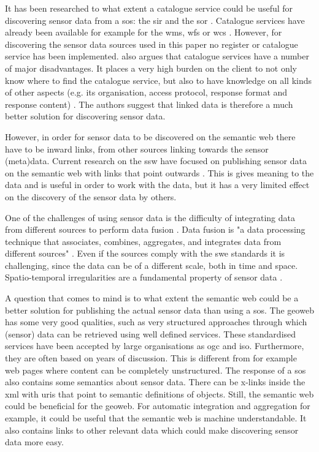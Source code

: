 It has been researched to what extent a catalogue service could be useful for discovering sensor data from a \ac{sos}: the \ac{sir} \citep{SW:OGC3} and the \ac{sor} \citep{SW:OGC4}. Catalogue services have already been available for example for the \ac{wms}, \ac{wfs} or \ac{wcs} \citep{SDI:OGC2}. However, for discovering the sensor data sources used in this paper no register or catalogue service has been implemented. \cite{SSW:Atkinson} also argues that catalogue services have a number of major disadvantages. It places a very high burden on the client to not only know where to find the catalogue service, but also to have knowledge on all kinds of other aspects (e.g. its organisation, access protocol, response format and response content) \cite[p.128]{SSW:Atkinson}. The authors suggest that linked data is therefore a much better solution for discovering sensor data. 

However, in order for sensor data to be discovered on the semantic web there have to be inward links, from other sources linking towards the sensor (meta)data. Current research on the \ac{ssw} have focused on publishing sensor data on the semantic web with links that point outwards \citep{SSW:Atkinson, SSW:Janowicz, SSW:Pschorr}. This is gives meaning to the data and is useful in order to work with the data, but it has a very limited effect on the discovery of the sensor data by others. 

One of the challenges of using sensor data is the difficulty of integrating data from different sources to perform data fusion \citep{SSW:Corcho, SSW:Ji, SSW:Wang}. Data fusion is "a data processing technique that associates, combines, aggregates, and integrates data from different sources" \cite[p. 2]{SSW:Wang2}. Even if the sources comply with the \ac{swe} standards it is challenging, since the data can be of a different scale, both in time and space. Spatio-temporal irregularities are a fundamental property of sensor data \citep{SW:Ganesan}. 

A question that comes to mind is to what extent the semantic web could be a better solution for publishing the actual sensor data than using a \ac{sos}. The geoweb has some very good qualities, such as very structured approaches through which (sensor) data can be retrieved using well defined services. These standardised services have been accepted by large organisations as \ac{ogc} and \ac{iso}. Furthermore, they are often based on years of discussion. This is different from for example web pages where content can be completely unstructured. The response of a \ac{sos} also contains some semantics about sensor data. There can be x-links inside the \ac{xml} with \ac{uri}s that point to semantic definitions of objects. Still, the semantic web could be beneficial for the geoweb. For automatic integration and aggregation for example, it could be useful that the semantic web is machine understandable. It also contains links to other relevant data which could make discovering sensor data more easy. 


